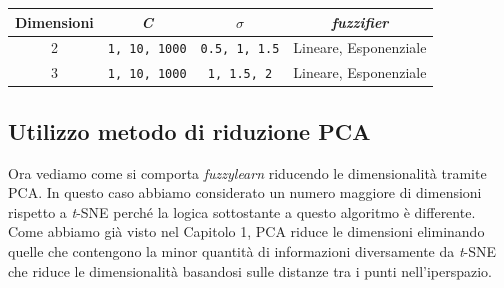 \documentclass[12pt,italian]{report}
\begin{document}
\begin{table}[h!]
	\centering
	\begin{tabular}{|c|c|c|c|}
		\hline
		Dimensioni & \emph{C}           & $ \sigma $       & \emph{fuzzifier}             \\ \hline
		2 & \texttt{1, 10, 1000} & \texttt{0.5, 1, 1.5} & Lineare, Esponenziale \\ \hline
		3 & \texttt{1, 10, 1000} & \texttt{1, 1.5, 2}   & Lineare, Esponenziale \\ \hline
	\end{tabular}
\end{table}



\subsection{Utilizzo metodo di riduzione PCA}
Ora vediamo come si comporta \emph{fuzzylearn} riducendo le dimensionalità tramite PCA. In questo caso abbiamo considerato un numero maggiore di dimensioni rispetto a \emph{t}-SNE perché la logica sottostante a questo algoritmo è differente. Come abbiamo già visto nel Capitolo 1, PCA riduce le dimensioni eliminando quelle che contengono la minor quantità di informazioni diversamente da \emph{t}-SNE che riduce le dimensionalità basandosi sulle distanze tra i punti nell'iperspazio. 
\end{document}
